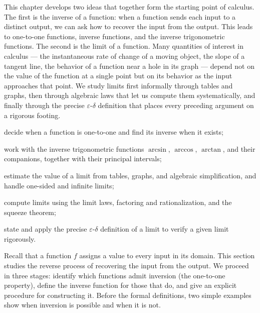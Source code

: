 \documentclass[a4paper,12pt,oneside]{memoir}
\begin{document}
\begin{lead}
This chapter develops two ideas that together form the starting point of calculus. The first is the inverse of a function: when a function sends each input to a distinct output, we can ask how to recover the input from the output. This leads to one-to-one functions, inverse functions, and the inverse trigonometric functions. The second is the limit of a function. Many quantities of interest in calculus — the instantaneous rate of change of a moving object, the slope of a tangent line, the behavior of a function near a hole in its graph — depend not on the value of the function at a single point but on its behavior as the input approaches that point. We study limits first informally through tables and graphs, then through algebraic laws that let us compute them systematically, and finally through the precise \(\varepsilon\)-\(\delta\) definition that places every preceding argument on a rigorous footing.
\end{lead}
\begin{objectives}
  \item decide when a function is one-to-one and find its inverse when it exists;
  \item work with the inverse trigonometric functions \(\arcsin\), \(\arccos\), \(\arctan\), and their companions, together with their principal intervals;
  \item estimate the value of a limit from tables, graphs, and algebraic simplification, and handle one-sided and infinite limits;
  \item compute limits using the limit laws, factoring and rationalization, and the squeeze theorem;
  \item state and apply the precise \(\varepsilon\)-\(\delta\) definition of a limit to verify a given limit rigorously.
\end{objectives}
Recall that a function \(f\) assigns a value to every input in its domain. This section studies the reverse process of recovering the input from the output. We proceed in three stages: identify which functions admit inversion (the one-to-one property), define the inverse function for those that do, and give an explicit procedure for constructing it. Before the formal definitions, two simple examples show when inversion is possible and when it is not.
\end{document}
